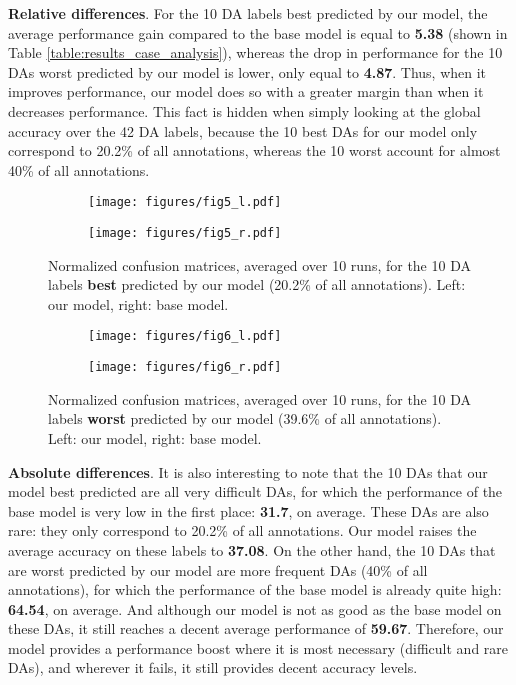 \documentclass[11pt,a4paper]{article}
\begin{document}
\noindent \textbf{Relative differences}. For the 10 DA labels best predicted by our model, the average performance gain compared to the base model is equal to \textbf{5.38} (shown in Table \ref{table:results_case_analysis}), whereas the drop in performance for the 10 DAs worst predicted by our model is lower, only equal to \textbf{4.87}.
Thus, when it improves performance, our model does so with a greater margin than when it decreases performance.
This fact is hidden when simply looking at the global accuracy over the 42 DA labels, because the 10 best DAs for our model only correspond to 20.2\% of all annotations, whereas the 10 worst account for almost 40\% of all annotations.
\\

\begin{figure*}[ht]
\centering
\begin{subfigure}[t]{0.49\textwidth}
\hspace{0.7em}
\texttt{[image: figures/fig5\_l.pdf]}
\end{subfigure}
\begin{subfigure}[t]{0.49\textwidth}
\centering
\texttt{[image: figures/fig5\_r.pdf]}
\end{subfigure}
\caption{Normalized confusion matrices, averaged over 10 runs, for the 10 DA labels \textbf{best} predicted by our model (20.2\% of all annotations). Left: our model, right: base model.}
\label{fig:best_confusion}
\end{figure*}

\begin{figure*}[ht]
\centering
\begin{subfigure}[t]{0.49\textwidth}
\hspace{-0.7em}
\texttt{[image: figures/fig6\_l.pdf]}
\end{subfigure}
\begin{subfigure}[t]{0.49\textwidth}
\centering
\texttt{[image: figures/fig6\_r.pdf]}
\end{subfigure}
\caption{Normalized confusion matrices, averaged over 10 runs, for the 10 DA labels \textbf{worst} predicted by our model (39.6\% of all annotations). Left: our model, right: base model.}
\label{fig:worst_confusion}
\end{figure*}

\noindent \textbf{Absolute differences}.
It is also interesting to note that the 10 DAs that our model best predicted are all very difficult DAs, for which the performance of the base model is very low in the first place: \textbf{31.7}, on average.
These DAs are also rare: they only correspond to 20.2\% of all annotations.
Our model raises the average accuracy on these labels to \textbf{37.08}.
On the other hand, the 10 DAs that are worst predicted by our model are more frequent DAs (40\% of all annotations), for which the performance of the base model is already quite high: \textbf{64.54}, on average.
And although our model is not as good as the base model on these DAs, it still reaches a decent average performance of \textbf{59.67}.
Therefore, our model provides a performance boost where it is most necessary (difficult and rare DAs), and wherever it fails, it still provides decent accuracy levels.\\
\end{document}
